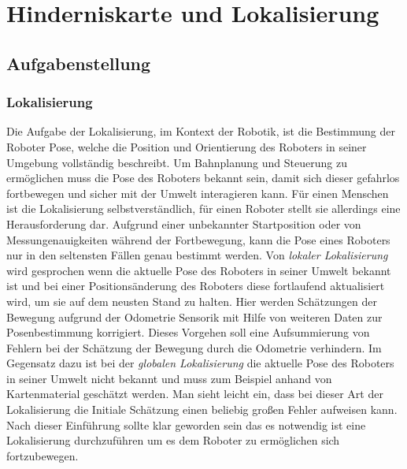 \chapter{Hinderniskarte und Lokalisierung}
\label{lokalisierung_cha}
\section{Aufgabenstellung}
\label{lokalisierung_aufgabenstellung_sec}
\authorsection{\editorandreas}
\subsection{Lokalisierung}
Die Aufgabe der Lokalisierung, im Kontext der Robotik, ist die Bestimmung der
Roboter Pose, welche die Position und Orientierung des Roboters in seiner Umgebung vollständig beschreibt.
 Um Bahnplanung und Steuerung zu ermöglichen muss die Pose des Roboters bekannt sein,
 damit sich dieser gefahrlos fortbewegen und sicher mit der Umwelt interagieren kann.
 Für einen Menschen ist die Lokalisierung selbstverständlich, für einen Roboter
 stellt sie allerdings eine Herausforderung dar.
 Aufgrund einer unbekannter Startposition oder von Messungenauigkeiten während
 der Fortbewegung, kann die Pose eines Roboters nur in den seltensten Fällen
 genau bestimmt werden.
 Von \emph{lokaler Lokalisierung} wird gesprochen wenn die aktuelle Pose des
 Roboters in seiner Umwelt bekannt ist und bei einer Positionsänderung des Roboters diese
 fortlaufend aktualisiert wird, um sie auf dem neusten Stand zu halten. Hier
 werden Schätzungen der Bewegung aufgrund der Odometrie Sensorik mit Hilfe von weiteren Daten zur Posenbestimmung korrigiert. Dieses Vorgehen soll eine Aufsummierung von Fehlern bei der
 Schätzung der Bewegung durch die Odometrie verhindern. Im Gegensatz dazu ist
 bei der \emph{globalen Lokalisierung} die aktuelle Pose des Roboters in seiner
 Umwelt nicht bekannt und muss zum Beispiel anhand von Kartenmaterial geschätzt werden.
 Man sieht leicht ein, dass bei dieser Art der Lokalisierung die Initiale Schätzung einen beliebig großen Fehler aufweisen kann.
 Nach dieser Einführung sollte klar geworden sein das es notwendig ist eine
 Lokalisierung durchzuführen um es dem Roboter zu ermöglichen sich
 fortzubewegen.
